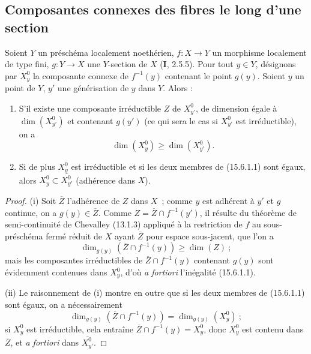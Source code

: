 
\subsection{Composantes connexes des fibres le long d'une section}
\label{subsection:IV.15.6-fr}

\begin{proposition}[15.6.1]
\label{IV.15.6.1-fr}
Soient $Y$ un préschéma localement noethérien, $f:X\to Y$ un morphisme localement de type fini, $g:Y\to X$ une $Y$-section de $X$ (\textbf{I}, 2.5.5). Pour tout $y\in Y$, désignons par $X_y^0$ la composante connexe de $f^{-1}(y)$ contenant le point $g(y)$. Soient $y$ un point de $Y$, $y'$ une générisation de $y$ dans $Y$. Alors :
\begin{enumerate}[label=\emph{(\roman*)}]
  \item S'il existe une composante irréductible $Z$ de $X_{y'}^0$, de dimension égale à $\dim(X_{y'}^0)$ et contenant $g(y')$ (ce qui sera le cas si $X_{y'}^0$ est irréductible), on a
\begin{equation}
\tag{15.6.1.1}
\label{IV.15.6.1.1-fr}
  \dim(X_y^0)\geqslant\dim(X_{y'}^0).
\end{equation}
  \item Si de plus $X_y^0$ est irréductible et si les deux membres de (15.6.1.1) sont égaux, alors $X_y^0\subset\overline{X_{y'}^0}$ (adhérence dans $X$).
\end{enumerate}
\end{proposition}

\begin{proof}
(i) Soit $\overline Z$ l'adhérence de $Z$ dans $X$~; comme $y$ est adhérent à $y'$ et $g$ continue, on a $g(y)\in\overline Z$. Comme $Z=\overline Z\cap f^{-1}(y')$, il résulte du théorème de semi-continuité de Chevalley (13.1.3) appliqué à la restriction de $f$ au sous-préschéma fermé réduit de $X$ ayant $\overline Z$ pour espace sous-jacent, que l'on a
\[
  \dim_{g(y)}(\overline Z\cap f^{-1}(y))\geqslant\dim(Z)~;
\]
mais les composantes irréductibles de $\overline Z\cap f^{-1}(y)$ contenant $g(y)$ sont évidemment contenues dans $X_y^0$, d'où \emph{a fortiori} l'inégalité (15.6.1.1).

(ii) Le raisonnement de (i) montre en outre que si les deux membres de (15.6.1.1) sont égaux, on a nécessairement
\[
  \dim_{g(y)}(\overline Z\cap f^{-1}(y))=\dim_{g(y)}(X_y^0)~;
\]
si $X_y^0$ est irréductible, cela entraîne $\overline Z\cap f^{-1}(y)=X_y^0$, donc $X_y^0$ est contenu dans $\overline Z$, et \emph{a fortiori} dans $\overline{X_{y'}^0}$.
\end{proof}

